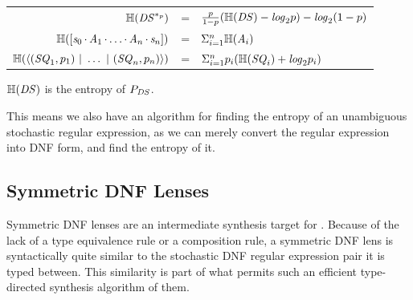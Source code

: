 \documentclass[acmsmall,screen,anonymous]{acmart}
\begin{document}
\begin{center}
  \begin{tabular}{rcl}
    $\mathbb{H}(\mathit{DS}^{*_{p}})$
    & =
    & $\frac{p}{1-p}(\mathbb{H}(\mathit{DS}) - \mathit{log}_2p)
      - \mathit{log}_2(1-p)
      $\\
    
    $\mathbb{H}([\mathit{s}_0 \mkern-1mu\cdot\mkern-1mu \mathit{A}_1 \mkern-1mu\cdot\mkern-1mu \ldots \mkern-1mu\cdot\mkern-1mu \mathit{A}_n \mkern-1mu\cdot\mkern-1mu \mathit{s}_n])$
    & =
    & $\Sigma_{i = 1}^n\mathbb{H}(\mathit{A}_i)$ \\
    
    $\mathbb{H}(\langle(\mathit{SQ}_1,p_1) ~|~ \ldots ~|~ (\mathit{SQ}_n,p_n)\rangle)$
    & =
    & $\Sigma_{i=1}^np_i(\mathbb{H}(\mathit{SQ}_i)+\mathit{log}_2p_i)$\\
  \end{tabular}
\end{center}

\begin{theorem}
  $\mathbb{H}(\mathit{DS})$ is the entropy of $P_{\mathit{DS}}$.
\end{theorem}

This means we also have an algorithm for finding the entropy of an unambiguous
stochastic regular expression, as we can merely convert the regular expression
into DNF form, and find the entropy of it.

\subsection{Symmetric DNF Lenses}
Symmetric DNF lenses are an intermediate synthesis target for \GreedySynth.
Because of the lack of a type equivalence rule or a composition rule, a
symmetric DNF lens is syntactically quite similar to the stochastic DNF regular
expression pair it is typed between. This similarity is part of what permits
such an efficient type-directed synthesis algorithm of them.
\end{document}
